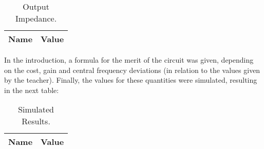 \begin{table}[h]
  \centering
  \begin{tabular}{|l|r|}
    \hline    
    {\bf Name} & {\bf Value}\\ \hline
    
  \end{tabular}
  \caption{Output Impedance.}
  \label{tab:zout}
\end{table}


\par In the introduction, a formula for the merit of the circuit was given, depending on the cost, gain and central frequency deviations (in relation to the values given by the teacher). Finally, the values for these quantities were simulated, resulting in the next table:

\begin{table}[h]
  \centering
  \begin{tabular}{|l|r|}
    \hline    
    {\bf Name} & {\bf Value}\\ \hline
    
  \end{tabular}
  \caption{Simulated Results.}
  \label{tab:finalr}
\end{table}

\newpage

